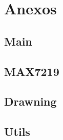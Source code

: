 \documentclass[12pt,a4paper]{article}
\begin{document}
\section{Anexos}

\subsection{Main}


\subsection{MAX7219}


\subsection{Drawning}


\subsection{Utils}

\end{document}
